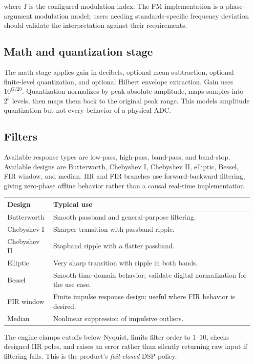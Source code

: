 \documentclass[10pt,a4paper]{article}
\begin{document}
where $I$ is the configured modulation index. The FM implementation is a phase-argument modulation model; users needing standards-specific frequency deviation should validate the interpretation against their requirements.

\subsection{Math and quantization stage}

The math stage applies gain in decibels, optional mean subtraction, optional finite-level quantization, and optional Hilbert envelope extraction. Gain uses $10^{G/20}$. Quantization normalizes by peak absolute amplitude, maps samples into $2^b$ levels, then maps them back to the original peak range. This models amplitude quantization but not every behavior of a physical ADC.

\subsection{Filters}

Available response types are low-pass, high-pass, band-pass, and band-stop. Available designs are Butterworth, Chebyshev I, Chebyshev II, elliptic, Bessel, FIR window, and median. IIR and FIR branches use forward-backward filtering, giving zero-phase offline behavior rather than a causal real-time implementation.

\begin{tabularx}{\textwidth}{L{3cm}Y}
\toprule
Design & Typical use\\
\midrule
Butterworth & Smooth passband and general-purpose filtering.\\
Chebyshev I & Sharper transition with passband ripple.\\
Chebyshev II & Stopband ripple with a flatter passband.\\
Elliptic & Very sharp transition with ripple in both bands.\\
Bessel & Smooth time-domain behavior; validate digital normalization for the use case.\\
FIR window & Finite impulse response design; useful where FIR behavior is desired.\\
Median & Nonlinear suppression of impulsive outliers.\\
\bottomrule
\end{tabularx}

The engine clamps cutoffs below Nyquist, limits filter order to 1--10, checks designed IIR poles, and raises an error rather than silently returning raw input if filtering fails. This is the product's \emph{fail-closed} DSP policy.
\end{document}
